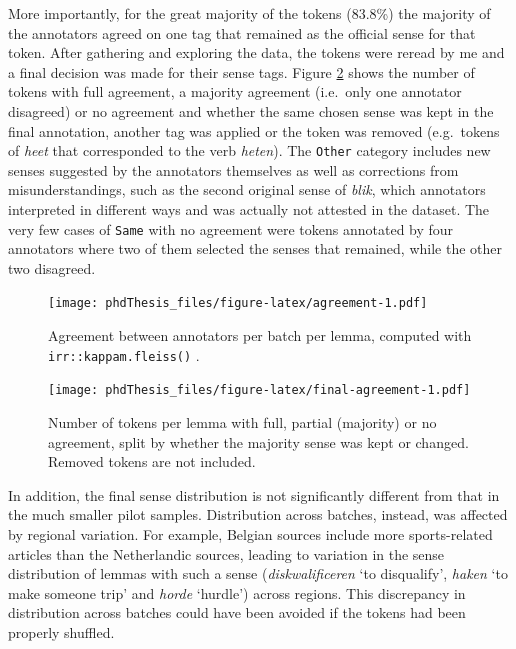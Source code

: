 \documentclass[
]{book}
\begin{document}
More importantly, for the great majority of the tokens
(83.8\%)
the majority of the annotators agreed on one tag that remained as the official sense for that token.
After gathering and exploring the data, the tokens were reread by me and a final decision was made for their sense tags. Figure \ref{fig:final-agreement} shows the number of tokens with full agreement, a majority agreement (i.e.~only one annotator disagreed) or no agreement and whether the same chosen sense was kept in the final annotation, another tag was applied or the token was removed (e.g.~tokens of \emph{heet} that corresponded to the verb \emph{heten}). The \texttt{Other} category includes new senses suggested by the annotators themselves as well as corrections from misunderstandings, such as the second original sense of \emph{blik}, which annotators interpreted in different ways and was actually not attested in the dataset. The very few cases of \texttt{Same} with no agreement were tokens annotated by four annotators where two of them selected the senses that remained, while the other two disagreed.



\begin{figure}
\centering
\texttt{[image: phdThesis\_files/figure-latex/agreement-1.pdf]}
\caption{\label{fig:agreement}Agreement between annotators per batch per lemma, computed with \texttt{irr::kappam.fleiss()} \autocite{R-irr}.}
\end{figure}



\begin{figure}
\centering
\texttt{[image: phdThesis\_files/figure-latex/final-agreement-1.pdf]}
\caption{\label{fig:final-agreement}Number of tokens per lemma with full, partial (majority) or no agreement, split by whether the majority sense was kept or changed. Removed tokens are not included.}
\end{figure}

In addition, the final sense distribution is not significantly different from that in the much smaller pilot samples. Distribution across batches, instead, was affected by regional variation. For example, Belgian sources include more sports-related articles than the Netherlandic sources, leading to variation in the sense distribution of lemmas with such a sense (\emph{diskwalificeren} `to disqualify', \emph{haken} `to make someone trip' and \emph{horde} `hurdle') across regions. This discrepancy in distribution across batches could have been avoided if the tokens had been properly shuffled.
\end{document}
